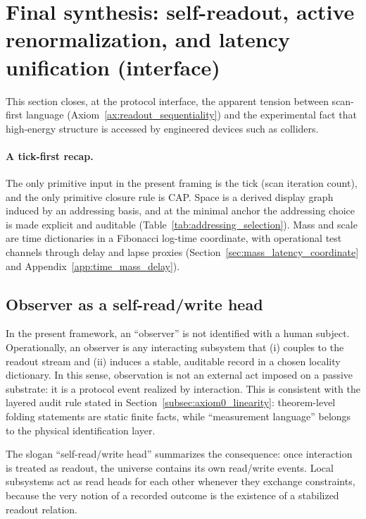 \section{Final synthesis: self-readout, active renormalization, and latency unification (interface)}
\label{sec:final_synthesis}

\InterfaceTag This section closes, at the protocol interface, the apparent tension between scan-first language (Axiom~\ref{ax:readout_sequentiality}) and the experimental fact that high-energy structure is accessed by engineered devices such as colliders.

\paragraph{A tick-first recap.}
The only primitive input in the present framing is the tick (scan iteration count), and the only primitive closure rule is CAP.
Space is a derived display graph induced by an addressing basis, and at the minimal anchor the addressing choice is made explicit and auditable (Table~\ref{tab:addressing_selection}).
Mass and scale are time dictionaries in a Fibonacci log-time coordinate, with operational test channels through delay and lapse proxies (Section~\ref{sec:mass_latency_coordinate} and Appendix~\ref{app:time_mass_delay}).

\subsection{Observer as a self-read/write head}
\label{subsec:self_read_write_head}

In the present framework, an ``observer'' is not identified with a human subject.
Operationally, an observer is any interacting subsystem that (i) couples to the readout stream and (ii) induces a stable, auditable record in a chosen locality dictionary.
In this sense, observation is not an external act imposed on a passive substrate: it is a protocol event realized by interaction.
This is consistent with the layered audit rule stated in Section~\ref{subsec:axiom0_linearity}: theorem-level folding statements are static finite facts, while ``measurement language'' belongs to the physical identification layer.

The slogan ``self-read/write head'' summarizes the consequence: once interaction is treated as readout, the universe contains its own read/write events.
Local subsystems act as read heads for each other whenever they exchange constraints, because the very notion of a recorded outcome is the existence of a stabilized readout relation.


